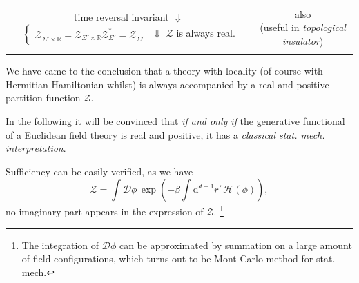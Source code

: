 \begin{center}
\begin{tabular}{|c|c|}
        \parbox{6cm}{\centering
            time reversal invariant \\
            $\Downarrow$ \\
            $\begin{cases} 
                \mathcal{Z}_{\Sigma' \times \bar{\mathbb{R}}} = \mathcal{Z}_{\Sigma' \times \mathbb{R}} \\
                \mathcal{Z}_{\Sigma'}^{*} = \mathcal{Z}_{\bar{\Sigma}'}
              \end{cases}
            $\\
            $\Downarrow$ \\
            $\mathcal{Z}$ is always real.
            }&
        \parbox{6cm}{
            \centering also \\ (useful in \emph{topological insulator})
            }
            \\ & \\
            \hline
        
    \end{tabular}
\end{center}
\clearpage
We have came to the conclusion that a theory with locality (of course with Hermitian Hamiltonian whilst) is always accompanied by a real and positive partition function $\mathcal{Z}$.



In the following it will be convinced that \emph{if and only if} the generative functional of a Euclidean field theory is real and positive, it has a \emph{classical stat. mech. interpretation}.

Sufficiency can be easily verified, as we have
\begin{equation}
  \mathcal{Z} = \int \mathcal{D} \phi  \, \exp\left( - \beta \int \mathrm{d} ^{d+1} r' \, \mathcal{H}(\phi) \right),
\end{equation}
no imaginary part appears in the expression of $\mathcal{Z}$.
\footnote{The integration of $\mathcal{D} \phi $ can be approximated by summation on a large amount of field configurations, which turns out to be Mont Carlo method for stat. mech.}

